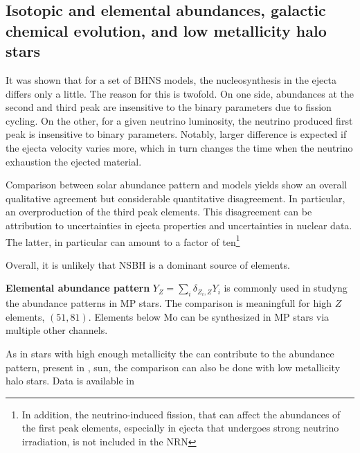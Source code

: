 \subsection{Isotopic and elemental abundances, galactic chemical evolution, and low metallicity halo stars}

It was shown that for a set of \ac{BHNS} models, the nucleosynthesis in the ejecta differs only a little. The reason for this is twofold. On one side, abundances at the second and third peak are insensitive to the binary parameters due to fission cycling. On the other, for a given neutrino luminosity, the neutrino produced first peak is insensitive to binary parameters. Notably, larger difference is expected if the ejecta velocity varies more, which in turn changes the time when the neutrino exhaustion the ejected material.

Comparison between solar \rproc{} abundance pattern and models yields show an overall qualitative agreement but considerable quantitative disagreement. In particular, an overproduction of the third peak elements. This disagreement can be attribution to uncertainties in ejecta properties and uncertainties in nuclear data. The latter, in particular can amount to a factor of ten\footnote{In addition, the neutrino-induced fission, that can affect the abundances of the first peak elements, especially in ejecta that undergoes strong neutrino irradiation, is not included in the \ac{NRN}} 

Overall, it is unlikely that \ac{NSBH} is a dominant source of \rproc{} elements. 

\textbf{Elemental abundance pattern} $Y_Z = \sum_i \delta_{Z_i,Z}Y_i$ is commonly used in studyng the abundance patterns in \ac{MP} stars. The comparison is meaningfull for high $Z$ elements, $(51,81)$.
Elements below Mo can be synthesized in \ac{MP} stars via multiple other channels.

As in stars with high enough metallicity the \sproc{} can contribute to the abundance pattern, present in \eg, sun, the comparison can also be done with low metallicity halo stars. Data is available in

